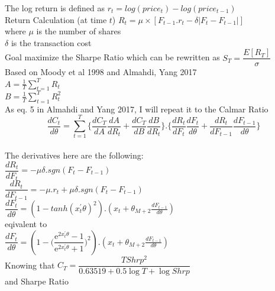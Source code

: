 \documentclass[12pt, a4paper, twoside]{article}
\begin{document}
The log return is defined as $ r_t = log(price_t) - log(price_{t-1})$\\

Return Calculation (at time $ t $)
$ R_t = \mu \times [F_{t-1}.r_t - \delta|F_t-F_{t-1}|]$\\
where $\mu$ is the number of shares\\
$\delta$ is the transaction cost\\

Goal maximize the Sharpe Ratio which can be rewritten as $ S_T = \dfrac{E[R_T]}{\sigma}$\\

Based on Moody et al 1998 and Almahdi, Yang 2017\\

$ A = \frac{1}{T}\sum_{t=1}^{T}R_t $\\

$ B = \frac{1}{T}\sum_{t=1}^{T}R_{t}^{2} $\\

As eq. 5 in Almahdi and Yang 2017, I will repeat it to the Calmar Ratio\\

$$ \frac{dC_t}{d\theta} = \sum_{t=1}^{T}  \{\frac{dC_T}{dA}\frac{dA}{dR_t}+\frac{dC_T}{dB}\frac{dB}{dR_t}\}.\{\frac{dR_t}{dF_t}\frac{dF_t}{d\theta}+\frac{dR_t}{dF_{t-1}}\frac{dF_{t-1}}{d\theta}\} $$\\

The derivatives here are the following:\\

$ \dfrac{dR_t}{dF_t} = -\mu\delta.sgn(F_t - F_{t-1}) $\\

$ \dfrac{dR_t}{dF_{t-1}} = -\mu.r_t+\mu\delta.sgn(F_t - F_{t-1}) $\\

$ \dfrac{dF_t}{d\theta} = (1-tanh(x_{t}^{'}\theta)^2).(x_t + \theta_{M+2}\frac{dF_{t-1}}{d\theta}) $\\

eqivalent to\\

$ \dfrac{dF_t}{d\theta} = (1-\bigg(\dfrac{\mathrm{e}^{2x_{t}^{'}\theta}-1}{\mathrm{e}^{2x_{t}^{'}\theta}+1}\bigg)^2).(x_t + \theta_{M+2}\frac{dF_{t-1}}{d\theta}) $\\

Knowing that $ C_T  = \dfrac{TShrp^2}{0.63519 + 0.5\log T + \log Shrp}$\\

and Sharpe Ratio\\
\end{document}

